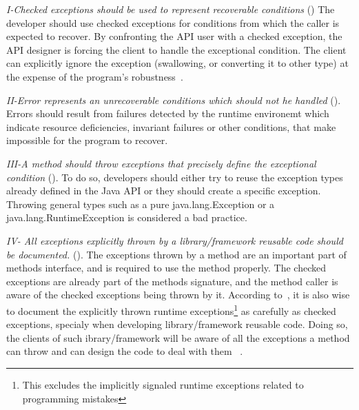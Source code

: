 \documentclass[conference]{IEEEtran}
\begin{document}
\emph{I-Checked exceptions should be used to represent recoverable
conditions} (\cite{mandrioli1992advances,gosling2000java,wirfs2006toward,bloch2008effective})
The developer should use checked exceptions for conditions from which the caller
is expected to recover. By confronting the API user with a checked exception,
the API designer is forcing the client to handle the exceptional condition. The
client can explicitly ignore the exception (swallowing, or converting it to
other type) at the expense of the program's robustness~\cite{gosling2000java}.

\emph{II-Error represents an unrecoverable conditions which should not he handled} 
(\cite{gosling2000java}).  Errors should result from failures detected
by the runtime environemt which indicate resource deficiencies, invariant
failures or other conditions, that make impossible for the program to recover.


\emph{III-A method should throw exceptions that precisely define the
exceptional condition} (\cite{gosling2000java,bloch2008effective}). To do so,
developers should either try to reuse the exception types already defined in the
Java API or they should create a specific exception. Throwing general types such as a
pure java.lang.Exception or a java.lang.RuntimeException is considered a bad practice.



\emph{IV- All exceptions explicitly thrown by a library/framework reusable code should be documented.}
(\cite{mandrioli1992advances,gosling2000java,wirfs2006toward,bloch2008effective}).
The exceptions thrown by a method are an important part of methods interface,
and is required to use the method properly. The checked exceptions are already
part of the  methods signature, and the method caller is aware of the checked
exceptions being thrown by it. According to~\cite{bloch2008effective}, it is
also wise to document the explicitly thrown runtime exceptions\footnote{This
excludes the implicitly signaled runtime exceptions related to programming
mistakes} as carefully as checked exceptions, specialy when developing
 library/framework reusable code. Doing so, the clients of such ibrary/framework
will be aware of all the exceptions a method can throw and can design the code
to deal with them ~\cite{Robil00}. 
\end{document}
